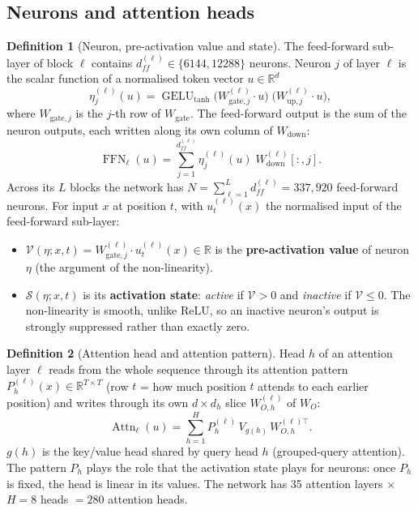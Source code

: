 \documentclass[10pt,a4paper]{article}
\newcommand{\op}[1]{\operatorname{#1}}
\theoremstyle{definition}
\newtheorem{definition}{Definition}[section]
\begin{document}
\subsection{Neurons and attention heads}
\begin{definition}[Neuron, pre-activation value and state]
The feed-forward sub-layer of block $\ell$ contains $d_{ff}^{(\ell)}\in\{6144,12288\}$ neurons. Neuron $j$ of layer $\ell$ is the scalar function of a normalised token vector $u\in\mathbb{R}^{d}$
\begin{equation}
  \eta^{(\ell)}_j(u) = \op{GELU}_{\tanh}\big(W^{(\ell)}_{\mathrm{gate},j}\cdot u\big)\;\big(W^{(\ell)}_{\mathrm{up},j}\cdot u\big),
\end{equation}
where $W_{\mathrm{gate},j}$ is the $j$-th row of $W_{\mathrm{gate}}$. The feed-forward output is the sum of the neuron outputs, each written along its own column of $W_{\mathrm{down}}$:
\begin{equation}
  \op{FFN}_\ell(u) = \sum_{j=1}^{d_{ff}^{(\ell)}} \eta^{(\ell)}_j(u)\;W^{(\ell)}_{\mathrm{down}}[:,j].
\end{equation}
Across its $L$ blocks the network has $N=\sum_{\ell=1}^{L} d_{ff}^{(\ell)}=337{,}920$ feed-forward neurons. For input $x$ at position $t$, with $u^{(\ell)}_t(x)$ the normalised input of the feed-forward sub-layer:
\begin{itemize}
\item $\mathcal{V}(\eta;x,t)=W^{(\ell)}_{\mathrm{gate},j}\cdot u^{(\ell)}_t(x)\in\mathbb{R}$ is the \textbf{pre-activation value} of neuron $\eta$ (the argument of the non-linearity).
\item $\mathcal{S}(\eta;x,t)$ is its \textbf{activation state}: \emph{active} if $\mathcal{V}>0$ and \emph{inactive} if $\mathcal{V}\le 0$. The non-linearity is smooth, unlike ReLU, so an inactive neuron's output is strongly suppressed rather than exactly zero.
\end{itemize}
\end{definition}
\begin{definition}[Attention head and attention pattern]
Head $h$ of an attention layer $\ell$ reads from the whole sequence through its attention pattern $P^{(\ell)}_h(x)\in\mathbb{R}^{T\times T}$ (row $t$ = how much position $t$ attends to each earlier position) and writes through its own $d\times d_h$ slice $W^{(\ell)}_{O,h}$ of $W_O$:
\begin{equation}
  \op{Attn}_\ell(u) = \sum_{h=1}^{H} P^{(\ell)}_h\,V_{g(h)}\,W^{(\ell)\top}_{O,h}.
\end{equation}
$g(h)$ is the key/value head shared by query head $h$ (grouped-query attention). The pattern $P_h$ plays the role that the activation state plays for neurons: once $P_h$ is fixed, the head is linear in its values. The network has 35 attention layers $\times$ $H=8$ heads $=280$ attention heads.
\end{definition}
\end{document}
